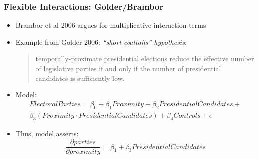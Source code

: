 \documentclass{beamer}
\numberwithin{equation}{section}
\begin{document}
\begin{frame}[fragile]
\frametitle{Flexible Interactions: Golder/Brambor}
\begin{itemize}
\item<1-> \footnotesize{Brambor et al 2006 argues for multiplicative interaction terms}
\item<2-> \footnotesize{Example from Golder 2006: \textit{``short-coattails'' hypothesis}}:\\
 \begin{quote}
 \scriptsize{temporally-proximate presidential elections reduce the effective number of legislative parties if and only if the number of presidential candidates is sufficiently low.}
 \end{quote}
\item<3-> Model:
\footnotesize{
\begin{equation}
\begin{split}
ElectoralParties = \beta_0 + \beta_1 Proximity + \beta_2 PresidentialCandidates+ \\
\beta_3 (Proximity \cdot PresidentialCandidates)+\beta_4 Controls + \epsilon \nonumber
\end{split}
\end{equation}
}
\item<4-> Thus, model asserts: $$\frac{\partial parties}{\partial proximity} = \beta_1+\beta_3 PresidentialCandidates$$
\end{itemize}



\end{frame}
\end{document}
